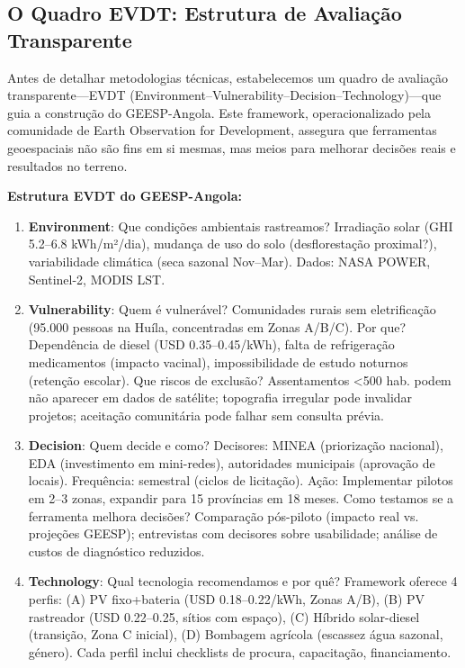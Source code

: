 \documentclass[12pt, a4paper]{article}
\begin{document}
\begin{itemize}
\subsection{O Quadro EVDT: Estrutura de Avaliação Transparente}

Antes de detalhar metodologias técnicas, estabelecemos um quadro de avaliação transparente—EVDT (Environment–Vulnerability–Decision–Technology)—que guia a construção do GEESP-Angola. Este framework, operacionalizado pela comunidade de Earth Observation for Development, assegura que ferramentas geoespaciais não são fins em si mesmas, mas meios para melhorar decisões reais e resultados no terreno.

\textbf{Estrutura EVDT do GEESP-Angola:}

\begin{enumerate}
\item \textbf{Environment}: Que condições ambientais rastreamos? Irradiação solar (GHI 5.2--6.8 kWh/m²/dia), mudança de uso do solo (desflorestação proximal?), variabilidade climática (seca sazonal Nov--Mar). Dados: NASA POWER, Sentinel-2, MODIS LST.

\item \textbf{Vulnerability}: Quem é vulnerável? Comunidades rurais sem eletrificação (95.000 pessoas na Huíla, concentradas em Zonas A/B/C). Por que? Dependência de diesel (USD 0.35--0.45/kWh), falta de refrigeração medicamentos (impacto vacinal), impossibilidade de estudo noturnos (retenção escolar). Que riscos de exclusão? Assentamentos <500 hab. podem não aparecer em dados de satélite; topografia irregular pode invalidar projetos; aceitação comunitária pode falhar sem consulta prévia.

\item \textbf{Decision}: Quem decide e como? Decisores: MINEA (priorização nacional), EDA (investimento em mini-redes), autoridades municipais (aprovação de locais). Frequência: semestral (ciclos de licitação). Ação: Implementar pilotos em 2--3 zonas, expandir para 15 províncias em 18 meses. Como testamos se a ferramenta melhora decisões? Comparação pós-piloto (impacto real vs. projeções GEESP); entrevistas com decisores sobre usabilidade; análise de custos de diagnóstico reduzidos.

\item \textbf{Technology}: Qual tecnologia recomendamos e por quê? Framework oferece 4 perfis: (A) PV fixo+bateria (USD 0.18--0.22/kWh, Zonas A/B), (B) PV rastreador (USD 0.22--0.25, sítios com espaço), (C) Híbrido solar-diesel (transição, Zona C inicial), (D) Bombagem agrícola (escassez água sazonal, género). Cada perfil inclui checklists de procura, capacitação, financiamento.
\end{enumerate}


\end{itemize}
\end{document}

